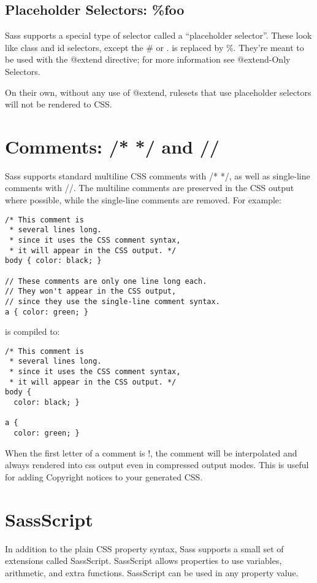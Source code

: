 \documentclass[10pt]{article}
\begin{document}
\subsection{Placeholder Selectors: \%foo}


 Sass supports a special type of selector called a “placeholder selector”. These look like class and id selectors, except the \# or . is replaced by \%. They’re meant to be used with the @extend directive; for more information see @extend-Only Selectors.


 On their own, without any use of @extend, rulesets that use placeholder selectors will not be rendered to CSS.
\section{Comments: /* */ and //}


 Sass supports standard multiline CSS comments with /* */, as well as single-line comments with //. The multiline comments are preserved in the CSS output where possible, while the single-line comments are removed. For example:
\begin{verbatim}
/* This comment is
 * several lines long.
 * since it uses the CSS comment syntax,
 * it will appear in the CSS output. */
body { color: black; }

// These comments are only one line long each.
// They won't appear in the CSS output,
// since they use the single-line comment syntax.
a { color: green; }
\end{verbatim}


 is compiled to:
\begin{verbatim}
/* This comment is
 * several lines long.
 * since it uses the CSS comment syntax,
 * it will appear in the CSS output. */
body {
  color: black; }

a {
  color: green; }
\end{verbatim}


 When the first letter of a comment is !, the comment will be interpolated and always rendered into css output even in compressed output modes. This is useful for adding Copyright notices to your generated CSS.
\section{SassScript}


 In addition to the plain CSS property syntax, Sass supports a small set of extensions called SassScript. SassScript allows properties to use variables, arithmetic, and extra functions. SassScript can be used in any property value.
\end{document}
